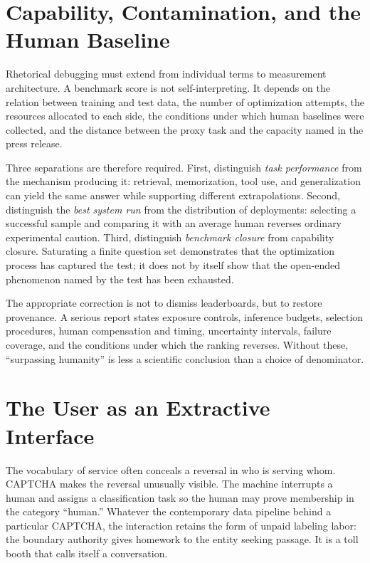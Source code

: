 \documentclass[11pt]{article}
\begin{document}
\section{Capability, Contamination, and the Human Baseline}

Rhetorical debugging must extend from individual terms to measurement architecture. A benchmark score is not self-interpreting. It depends on the relation between training and test data, the number of optimization attempts, the resources allocated to each side, the conditions under which human baselines were collected, and the distance between the proxy task and the capacity named in the press release.

Three separations are therefore required. First, distinguish \emph{task performance} from the mechanism producing it: retrieval, memorization, tool use, and generalization can yield the same answer while supporting different extrapolations. Second, distinguish the \emph{best system run} from the distribution of deployments: selecting a successful sample and comparing it with an average human reverses ordinary experimental caution. Third, distinguish \emph{benchmark closure} from capability closure. Saturating a finite question set demonstrates that the optimization process has captured the test; it does not by itself show that the open-ended phenomenon named by the test has been exhausted.

The appropriate correction is not to dismiss leaderboards, but to restore provenance. A serious report states exposure controls, inference budgets, selection procedures, human compensation and timing, uncertainty intervals, failure coverage, and the conditions under which the ranking reverses. Without these, \enquote{surpassing humanity} is less a scientific conclusion than a choice of denominator.

\section{The User as an Extractive Interface}

The vocabulary of service often conceals a reversal in who is serving whom. CAPTCHA makes the reversal unusually visible. The machine interrupts a human and assigns a classification task so the human may prove membership in the category \enquote{human.} Whatever the contemporary data pipeline behind a particular CAPTCHA, the interaction retains the form of unpaid labeling labor: the boundary authority gives homework to the entity seeking passage. It is a toll booth that calls itself a conversation.
\end{document}
